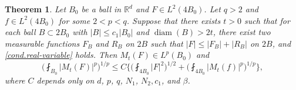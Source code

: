 \documentclass[reqno,12pt]{amsart} %
\newtheorem{theorem}{Theorem}[section]
\theoremstyle{definition}
\theoremstyle{remark}
\numberwithin{equation}{section}
\newcommand{\R}{\mathbb{R}}
\DeclareMathOperator{\diam}{diam}
\begin{document}
\begin{theorem}\label{thm.real-variable>t}
    Let $B_0$ be a ball in $\R^d$ and $F \in L^2(4B_0)$. Let $q>2$ and $f \in L^2(4B_0)$ for some $2 < p < q$. Suppose that there exists $t > 0$ such that for each ball $B \subset 2B_0$ with $|B| \le c_1 |B_0|$ and $\diam(B) > 2t$, there exist two measurable functions $F_B$ and $R_B$ on $2B$ such that $|F| \le |F_B| + |R_B|$ on $2B$, and \eqref{cond.real-variable} holds. Then $M_t(F) \in L^p(B_0)$ and
    \begin{equation}\label{est.real-variable-t}
    \bigg( \fint_{B_0} |M_t(F)|^p \bigg)^{1/p} \le C \bigg\{ \bigg( \fint_{4B_0} |F|^2 \bigg)^{1/2} + \bigg( \fint_{4B_0} |M_t(f)|^p \bigg)^{1/p} \bigg\},
    \end{equation}
    where $C$ depends only on $d$, $p$, $q$, $N_1$, $N_2, c_1$, and $\beta$.
\end{theorem}
\end{document}
